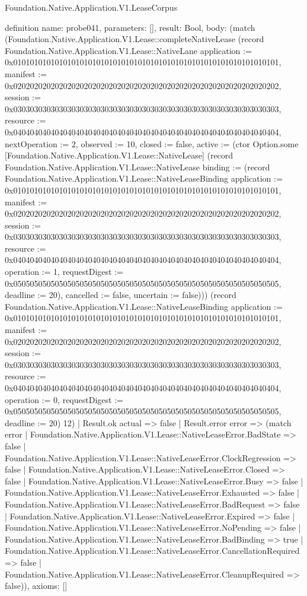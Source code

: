 \begin{lexlean}{Foundation.Native.Application.V1.LeaseCorpus}
\begin{semanticmodule}
definition{
  name: probe041,
  parameters: [],
  result: Bool,
  body: (match (Foundation.Native.Application.V1.Lease::completeNativeLease (record Foundation.Native.Application.V1.Lease::NativeLane {application := 0x0101010101010101010101010101010101010101010101010101010101010101, manifest := 0x0202020202020202020202020202020202020202020202020202020202020202, session := 0x0303030303030303030303030303030303030303030303030303030303030303, resource := 0x0404040404040404040404040404040404040404040404040404040404040404, nextOperation := 2, observed := 10, closed := false, active := (ctor Option.some [Foundation.Native.Application.V1.Lease::NativeLease] (record Foundation.Native.Application.V1.Lease::NativeLease {binding := (record Foundation.Native.Application.V1.Lease::NativeLeaseBinding {application := 0x0101010101010101010101010101010101010101010101010101010101010101, manifest := 0x0202020202020202020202020202020202020202020202020202020202020202, session := 0x0303030303030303030303030303030303030303030303030303030303030303, resource := 0x0404040404040404040404040404040404040404040404040404040404040404, operation := 1, requestDigest := 0x0505050505050505050505050505050505050505050505050505050505050505, deadline := 20}), cancelled := false, uncertain := false}))}) (record Foundation.Native.Application.V1.Lease::NativeLeaseBinding {application := 0x0101010101010101010101010101010101010101010101010101010101010101, manifest := 0x0202020202020202020202020202020202020202020202020202020202020202, session := 0x0303030303030303030303030303030303030303030303030303030303030303, resource := 0x0404040404040404040404040404040404040404040404040404040404040404, operation := 0, requestDigest := 0x0505050505050505050505050505050505050505050505050505050505050505, deadline := 20}) 12)
    | Result.ok actual => false
    | Result.error error => (match error
      | Foundation.Native.Application.V1.Lease::NativeLeaseError.BadState => false
      | Foundation.Native.Application.V1.Lease::NativeLeaseError.ClockRegression => false
      | Foundation.Native.Application.V1.Lease::NativeLeaseError.Closed => false
      | Foundation.Native.Application.V1.Lease::NativeLeaseError.Busy => false
      | Foundation.Native.Application.V1.Lease::NativeLeaseError.Exhausted => false
      | Foundation.Native.Application.V1.Lease::NativeLeaseError.BadRequest => false
      | Foundation.Native.Application.V1.Lease::NativeLeaseError.Expired => false
      | Foundation.Native.Application.V1.Lease::NativeLeaseError.NoPending => false
      | Foundation.Native.Application.V1.Lease::NativeLeaseError.BadBinding => true
      | Foundation.Native.Application.V1.Lease::NativeLeaseError.CancellationRequired => false
      | Foundation.Native.Application.V1.Lease::NativeLeaseError.CleanupRequired => false)),
  axioms: []
}


\end{semanticmodule}
\end{lexlean}
